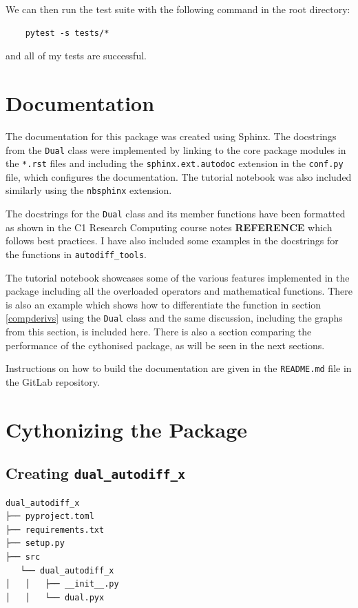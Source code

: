 \documentclass{article}
\begin{document}
We can then run the test suite with the following command in the root directory:
\begin{lstlisting}
    pytest -s tests/*
\end{lstlisting}
and all of my tests are successful. 

\section{Documentation} \label{docs}
The documentation for this package was created using Sphinx. The docstrings from the \texttt{Dual} class were implemented by linking to the core package modules in the \texttt{*.rst} files and including the \texttt{sphinx.ext.autodoc} extension in the \texttt{conf.py} file, which configures the documentation. The tutorial notebook was also included similarly using the \texttt{nbsphinx} extension. 

The docstrings for the \texttt{Dual} class and its member functions have been formatted as shown in the C1 Research Computing course notes \textbf{REFERENCE} which follows best practices. I have also included some examples in the docstrings for the functions in \texttt{autodiff\_tools}. 

The tutorial notebook showcases some of the various features implemented in the package including all the overloaded operators and mathematical functions. There is also an example which shows how to differentiate the function in section \ref{compderivs} using the \texttt{Dual} class and the same discussion, including the graphs from this section, is included here. There is also a section comparing the performance of the cythonised package, as will be seen in 
the next sections.

Instructions on how to build the documentation are given in the \texttt{README.md} file in the GitLab repository. 

\section{Cythonizing the Package}

\subsection{Creating \texttt{dual\_autodiff\_x}}
\begin{lstlisting}
dual_autodiff_x
├── pyproject.toml
├── requirements.txt
├── setup.py
├── src
   └── dual_autodiff_x
│   │   ├── __init__.py
│   │   └── dual.pyx

\end{lstlisting}
\end{document}
